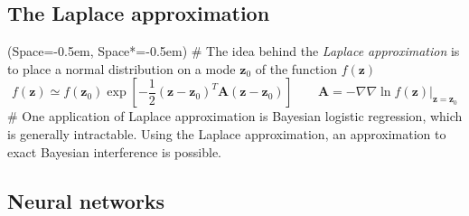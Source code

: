 \documentclass[12pt, a4paper]{article}
\newcommand{\listSpace}{-0.5em}%
\newcommand{\vect}[1]{\bm{#1}}
\begin{document}
\subsection*{The Laplace approximation}
\begin{easylist}[itemize]
	\ListProperties(Space=\listSpace, Space*=\listSpace)
	# The idea behind the \emph{Laplace approximation} is to place a normal distribution on a mode $\vect{z}_0$ of the function $f(\vect{z})$
	\begin{equation*}
		f(\vect{z}) \simeq f(\vect{z}_0) \exp \left[ 
		- \frac{1}{2}
		(\vect{z} - \vect{z}_0)^T \vect{A}
		(\vect{z} - \vect{z}_0)
		 \right]
		 \qquad
		 \vect{A} = \left. - \nabla \nabla \ln f(\vect{z}) \right|_{\vect{z} = \vect{z}_0}
	\end{equation*}
	# One application of Laplace approximation is Bayesian logistic regression, which is generally intractable.
	Using the Laplace approximation, an approximation to exact Bayesian interference is possible.
\end{easylist}

\subsection{Neural networks}
\end{document}
